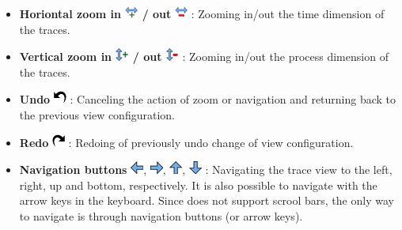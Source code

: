 \begin{itemize}
\item \textbf{Horiontal zoom in \includegraphics{fig/hpctraceviewer-button-zoom-in-time.png} / out }\includegraphics{fig/hpctraceviewer-button-zoom-out-time.png} : Zooming in/out the time dimension of the traces. 
\item \textbf{Vertical zoom in \includegraphics[scale=.5]{fig/hpctraceviewer-button-zoom-in-process.png} / out \includegraphics[scale=.5]{fig/hpctraceviewer-button-zoom-out-process.png} }: Zooming in/out the process dimension of the traces.
\item \textbf{Undo} \includegraphics[scale=.5]{fig/hpctraceviewer-button-undo.png} : Canceling the action of zoom or navigation and returning back to the previous view configuration.
\item \textbf{Redo} \includegraphics[scale=.5]{fig/hpctraceviewer-button-redo.png} : Redoing of previously undo change of view configuration.
\item \textbf{Navigation buttons} \includegraphics[scale=.5]{fig/hpctraceviewer-button-go-east.png}, \includegraphics[scale=.5]{fig/hpctraceviewer-button-go-west.png}, \includegraphics[scale=.5]{fig/hpctraceviewer-button-go-north.png}, \includegraphics[scale=.5]{fig/hpctraceviewer-button-go-south.png} : Navigating the trace view to the left, right, up and bottom, respectively. It is also possible to navigate with the arrow keys in the keyboard. Since \traceview{} does not support scrool bars, the only way to navigate is through navigation buttons (or arrow keys).


\end{itemize}

